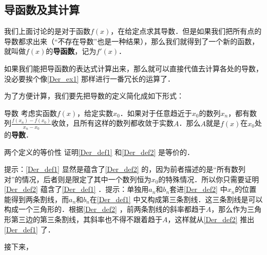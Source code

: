 \subsection{导函数及其计算}

我们上面讨论的是对于函数$f(x)$，在给定点求其导数．但是如果我们把所有点的导数都求出来（“不存在导数”也是一种结果），那么我们就得到了一个新的函数，就叫做$f(x)$的\textbf{导函数}，记为$f'(x)$．

如果我们能把导函数的表达式计算出来，那么就可以直接代值去计算各处的导数，没必要挨个像\autoref{Der_ex1} 那样进行一番冗长的运算了．





为了方便计算，我们要先把导数的定义简化成如下形式：

\begin{definition}{导数}\label{Der_def2}
考虑实函数$f(x)$，给定实数$x_0$．如果对于任意趋近于$x_0$的数列$x_n$，都有数列$\frac{f(x_n)-f(x_0)}{x_n-x_0}$收敛，且所有这样的数列都收敛于实数$A$．那么$A$就是$f(x)$在$x_0$处的\textbf{导数}．
\end{definition}

\begin{exercise}{两个定义的等价性}
证明\autoref{Der_def1} 和\autoref{Der_def2} 是等价的．

提示：\autoref{Der_def1} 显然是蕴含了\autoref{Der_def2} 的，因为前者描述的是“所有数列对”的情况，后者则是限定了其中一个数列恒为$x_0$的特殊情况．所以你只需要证明\autoref{Der_def2} 蕴含了\autoref{Der_def1} ．提示：单独用$a_n$和$b_n$套进\autoref{Der_def2} 中$x_n$的位置能得到两条割线，而$a_n$和$b_n$在\autoref{Der_def1} 中又构成第三条割线．这三条割线是可以构成一个三角形的．根据\autoref{Der_def2} ，前两条割线的斜率都趋于$A$，那么作为三角形第三边的第三条割线，其斜率也不得不跟着趋于$A$，这样就从\autoref{Der_def2} 推出\autoref{Der_def1} 了．
\end{exercise}

接下来，





